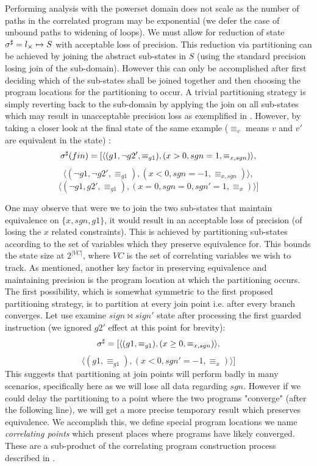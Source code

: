 Performing analysis with the powerset domain does not scale as the number of paths in the correlated program may be exponential (we defer the case of unbound paths to widening of loops). We must allow for reduction of state $\sigma^\sharp = l_{\times} \mapsto S$ with acceptable loss of precision. This reduction via partitioning can be achieved by joining the abstract sub-states in $S$ (using the standard precision losing join of the sub-domain). However this can only be accomplished after first deciding which of the sub-states shall be joined together and then choosing the program locations for the partitioning to occur. A trivial partitioning strategy is simply reverting back to the sub-domain by applying the join on all sub-states which may result in unacceptable precision loss as exemplified in . However, by taking a closer look at the final state of the same example ($\equiv_{v}$ means $v$ and $v'$ are equivalent in the state) :
{\footnotesize
\[
\sigma^\sharp(fin) = [ \langle (g1,\neg g2',\equiv_{g1}),(x>0,sgn=1,\equiv_{x,sgn}) \rangle,
\]
\[
\langle (\neg g1,\neg g2',\equiv_{g1}), (x<0,sgn=-1,\equiv_{x,sgn}) \rangle,
\]
\[
\langle (\neg g1,g2',\equiv_{g1}),(x=0,sgn=0,sgn'=1,\equiv_{x}) \rangle ]
\]
}

One may observe that were we to join the two sub-states that maintain equivalence on $\{x,sgn,g1\}$, it would result in an acceptable loss of precision (of losing the $x$ related constraints). This is achieved by partitioning sub-states according to the set of variables which they preserve equivalence for. This bounds the state size at $2^{|VC|}$, where $VC$ is the set of correlating variables we wish to track.
As mentioned, another key factor in preserving equivalence and maintaining precision is the program location at which the partitioning occurs. The first possibility, which is somewhat symmetric to the first proposed partitioning strategy, is to partition at every join point i.e. after every branch converges. Let use examine $sign \bowtie sign'$ state after processing the first guarded instruction  (we ignored $g2'$ effect at this point for brevity):
{\footnotesize
\[
\sigma^\sharp = [ \langle (g1,\equiv_{g1}),(x \geq 0,\equiv_{x,sgn}) \rangle,
\]
\[
\langle (g1,\equiv_{g1}),(x < 0,sgn' = -1, \equiv_{x}) \rangle ]
\]
}
This suggests that partitioning at join points will perform badly in many scenarios, specifically here as we will lose all data regarding $sgn$. However if we could delay the partitioning to a point where the two programs "converge" (after the following  line), we will get a more precise temporary result which preserves equivalence. We accomplish this, we define special program locations we name \emph{correlating points} which present places where programs have likely converged. These are a sub-product of the correlating program construction process described in .

